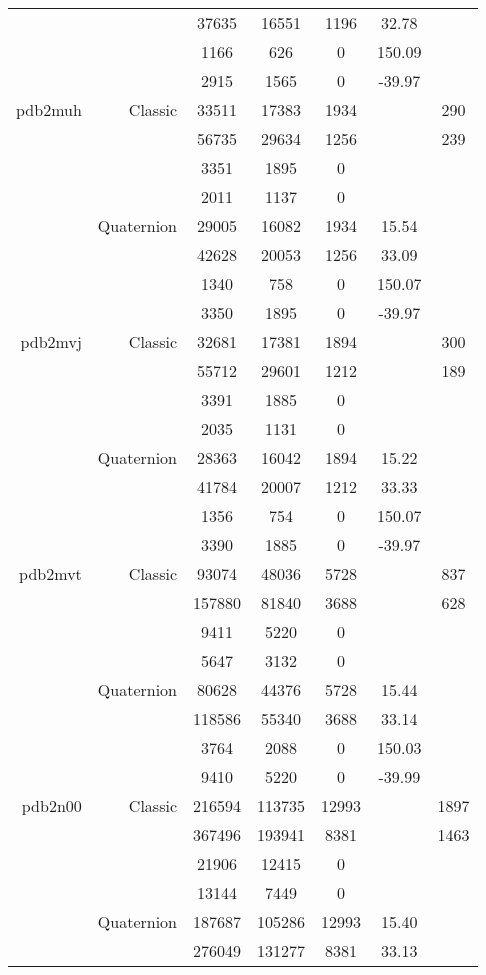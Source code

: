 \begin{xltabular}{\textwidth}{r|rcccSc}
& & 37635 & 16551 & 1196 & 32.78 & \\
& & 1166 & 626 & 0 & 150.09 & \\
& & 2915 & 1565 & 0 & -39.97 & \\ \addlinespace
pdb2muh & Classic & 33511 & 17383 & 1934 & & 290 \\
& & 56735 & 29634 & 1256 & & 239 \\
& & 3351 & 1895 & 0 & & \\
& & 2011 & 1137 & 0 & & \\
& Quaternion & 29005 & 16082 & 1934 & 15.54 & \\
& & 42628 & 20053 & 1256 & 33.09 & \\
& & 1340 & 758 & 0 & 150.07 & \\
& & 3350 & 1895 & 0 & -39.97 & \\ \addlinespace
pdb2mvj & Classic & 32681 & 17381 & 1894 & & 300 \\
& & 55712 & 29601 & 1212 & & 189 \\
& & 3391 & 1885 & 0 & & \\
& & 2035 & 1131 & 0 & & \\
& Quaternion & 28363 & 16042 & 1894 & 15.22 & \\
& & 41784 & 20007 & 1212 & 33.33 & \\
& & 1356 & 754 & 0 & 150.07 & \\
& & 3390 & 1885 & 0 & -39.97 & \\ \addlinespace
pdb2mvt & Classic & 93074 & 48036 & 5728 & & 837 \\
& & 157880 & 81840 & 3688 & & 628 \\
& & 9411 & 5220 & 0 & & \\
& & 5647 & 3132 & 0 & & \\
& Quaternion & 80628 & 44376 & 5728 & 15.44 & \\
& & 118586 & 55340 & 3688 & 33.14 & \\
& & 3764 & 2088 & 0 & 150.03 & \\
& & 9410 & 5220 & 0 & -39.99 & \\ \addlinespace
pdb2n00 & Classic & 216594 & 113735 & 12993 & & 1897 \\
& & 367496 & 193941 & 8381 & & 1463 \\
& & 21906 & 12415 & 0 & & \\
& & 13144 & 7449 & 0 & & \\
& Quaternion & 187687 & 105286 & 12993 & 15.40 & \\
& & 276049 & 131277 & 8381 & 33.13 & \\

\end{xltabular}
